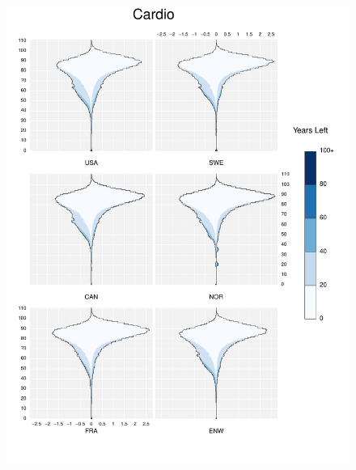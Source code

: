 \documentclass{article}
\begin{document}
\begin{appendices}
\begin{figure}
\includegraphics[scale=.8]{Figures/Causes/DxyCardio.pdf}
\end{figure}
\begin{figure}
\centering

\end{figure}
\end{appendices}
\end{document}
